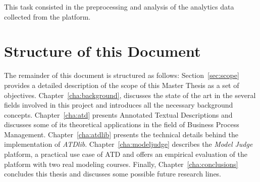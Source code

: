 This task consisted in the preprocessing and analysis of the analytics data
collected from the platform.






\section{Structure of this Document}


The remainder of this document is structured as follows: Section~\ref{sec:scope}
provides a detailed description of the scope of this Master Thesis as a set of
objectives. Chapter~\ref{cha:background}, discusses the state of the art in 
the several fields involved in this project and introduces all the necessary
background concepts. Chapter~\ref{cha:atd} presents Annotated Textual
Descriptions and discusses some of its theoretical applications in the field of
Business Process Management. Chapter~\ref{cha:atdlib} presents the technical
details behind the implementation of \emph{ATDlib}. Chapter~\ref{cha:modeljudge}
describes the \emph{Model Judge} platform, a practical use case of ATD and
offers an empirical evaluation of the platform with two real modeling courses.
Finally, Chapter~\ref{cha:conclusions} concludes this thesis and discusses some
possible future research lines.



